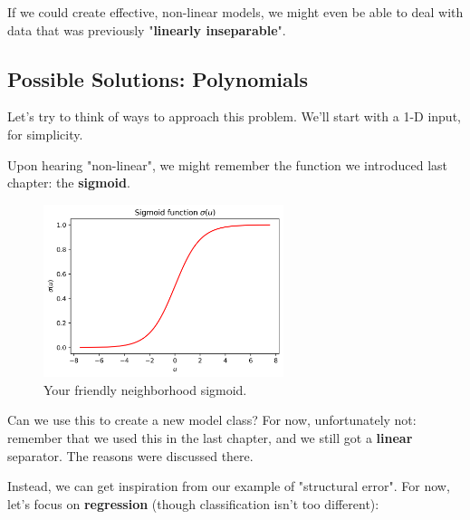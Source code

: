         If we could create effective, non-linear models, we might even be able to deal with data that was previously "\textbf{linearly inseparable}".

    \subsecdiv

    \subsection*{Possible Solutions: Polynomials}

        Let's try to think of ways to approach this problem. We'll start with a 1-D input, for simplicity.

        Upon hearing "non-linear", we might remember the function we introduced last chapter: the \textbf{sigmoid}.
    
        \begin{figure}[H]
            \centering
            
            \includegraphics[width=70mm,scale=0.5]{images/feature_images/sigmoid_u.png}
            \caption*{Your friendly neighborhood sigmoid.}
        \end{figure}
    
        Can we use this to create a new model class? For now, unfortunately not: remember that we used this in the last chapter, and we still got a \textbf{linear} separator. The reasons were discussed there.
    
        Instead, we can get inspiration from our example of "structural error". For now, let's focus on \textbf{regression} (though classification isn't too different):
    

